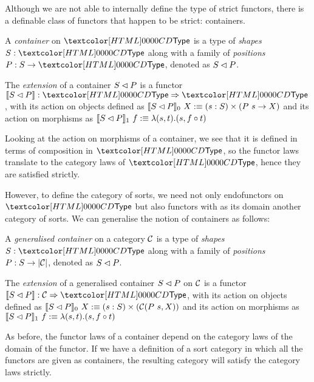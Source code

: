 Although we are not able to internally define the type of strict
functors, there is a definable class of functors that happen to be
strict: containers.

\begin{definition}
  A \emph{container} on $\Type$ is a type of \emph{shapes} $S : \Type$
  along with a family of \emph{positions} $P : S \to \Type$, denoted
  as $S \lhd P$.
\end{definition}

\begin{definition}
  The \emph{extension} of a container $S \lhd P$ is a functor
  $\context{\cont{S}{P}} : \Func{\Type}{\Type}$, with its action on
  objects defined as
  $\llbracket S \lhd P \rrbracket_0\ X :\equiv (s : S) \times (P\ s \to X)$ and
  its action on morphisms as
  $\llbracket S \lhd P \rrbracket_1\ f :\equiv \lambda (s , t) . (s , f \circ
  t)$
\end{definition}

Looking at the action on morphisms of a container, we see that it is
defined in terms of composition in $\Type$, so the functor laws
translate to the category laws of $\Type$, hence they are satisfied
strictly.

However, to define the category of sorts, we need not only
endofunctors on $\Type$ but also functors with as its domain another
category of sorts. We can generalise the notion of containers as
follows:

\begin{definition}
  A \emph{generalised container} on a category $\mathcal{C}$ is a type of
  \emph{shapes} $S : \Type$ along with a family of \emph{positions}
  $P : S \to | \mathcal{C} | $, denoted as $S \lhd P$.
\end{definition}

\begin{definition}
  The \emph{extension} of a generalised container $S \lhd P$ on
  $\mathcal{C}$ is a functor $\context{\cont{S}{P}} : \Func{\Cc}{\Type}$, with
  its action on objects defined as
  $\llbracket S \lhd P \rrbracket_0\ X :\equiv (s : S) \times (\mathcal{C}(P\ s, X))$
  and its action on morphisms as
  $\llbracket S \lhd P \rrbracket_1\ f :\equiv \lambda (s , t) . (s , f \circ
  t)$
\end{definition}

As before, the functor laws of a container depend on the category laws
of the domain of the functor. If we have a definition of a sort
category in which all the functors are given as containers, the
resulting category will satisfy the category laws strictly.



